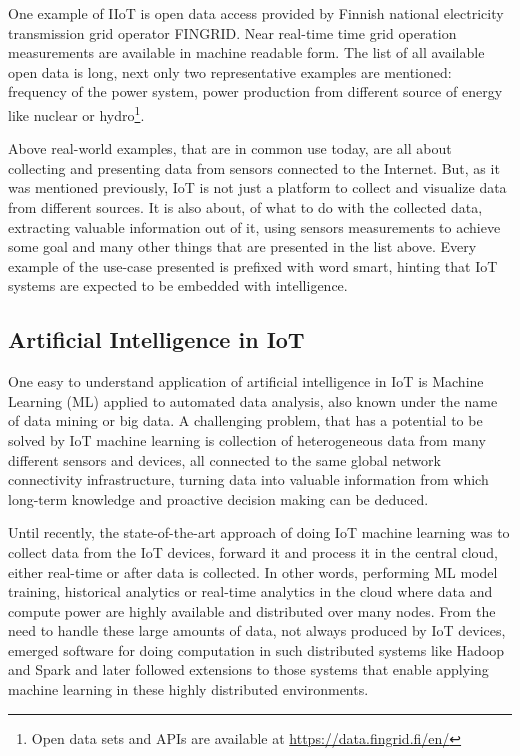 \documentclass[english, 12pt, a4paper, elec, utf8, online]{aaltothesis}
\begin{document}
One example of IIoT is open data access provided by Finnish national electricity transmission grid operator FINGRID. Near real-time time grid operation measurements are available in machine readable form. The list of all available open data is long, next only two representative examples are mentioned: frequency of the power system, power production from different source of energy like nuclear or hydro\footnote{Open data sets and APIs are available at \url{https://data.fingrid.fi/en/}}.  

Above real-world examples, that are in common use today, are all about collecting and presenting data from sensors connected to the Internet. But, as it was mentioned previously, IoT is not just a platform to collect and visualize data from different sources. It is also about, of what to do with the collected data, extracting valuable information out of it, using sensors measurements to achieve some goal and many other things that are presented in the list above. Every example of the use-case presented is prefixed with word smart, hinting that IoT systems are expected to be embedded with intelligence. 


\subsection{Artificial Intelligence in IoT}
One easy to understand application of artificial intelligence in IoT is Machine Learning (ML) applied to automated data analysis, also known under the name of data mining or big data. A challenging problem, that has a potential to be solved by IoT machine learning is collection of heterogeneous data from many different sensors and devices, all connected to the same global network connectivity infrastructure, turning data into valuable information from which long-term knowledge and proactive decision making can be deduced. 


Until recently, the state-of-the-art approach of doing IoT machine learning was to collect data from the IoT devices, forward it and process it in the central cloud, either real-time or after data is collected. In other words, performing ML model training, historical analytics or real-time analytics in the cloud where data and compute power are highly available and distributed over many nodes. From the need to handle these large amounts of data, not always produced by IoT devices, emerged software for doing computation in such distributed systems like Hadoop and Spark and later
followed extensions to those systems that enable applying machine learning in these highly distributed environments. 
\end{document}
